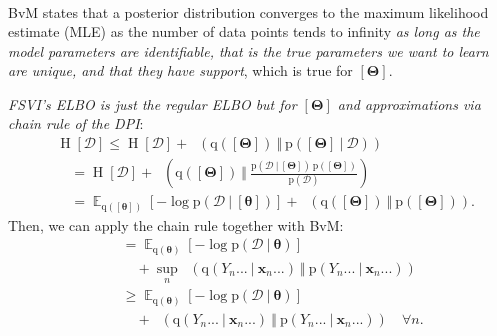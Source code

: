 \documentclass[25pt,a0paper,landscape]{tikzposter}
\DeclareMathOperator{\opExpectation}{\mathbb{E}}
\newcommand{\E}[2]{\opExpectation_{#1} \left [ #2 \right ]}
\newcommand{\MidSymbol}[1][]{\:#1\:}
\newcommand{\given}{\MidSymbol[\vert]}
\DeclareMathOperator{\opEntropy}{H}
\newcommand{\Hof}[1]{\opEntropy[#1]}
\DeclareMathOperator{\opKale}{D_\mathrm{KL}}
\newcommand{\Kale}[2]{\opKale(#1 \MidSymbol[\Vert] #2)}
\newcommand{\opp}{\mathrm{p}}
\newcommand{\pof}[1]{\opp(#1)}
\newcommand{\opq}{\mathrm{q}}
\newcommand{\qof}[1]{\opq(#1)}
\newcommand{\w}{\boldsymbol{\theta}}
\newcommand{\W}{\boldsymbol{\Theta}}
\newcommand{\Dany}{\mathcal{D}}
\newcommand{\Y}{Y}
\newcommand{\x}{\boldsymbol{x}}
\begin{document}
\begin{columns}
{\begin{multicols}{2}
\begin{proofbox}[title=Equality in the Infinite Data Limit]
\begin{multline*}
      \end{multline*}
    \end{proofbox}
    \begin{theorybox}[title=Bernstein von Mises' Theorem]
      BvM states that a posterior distribution converges to the maximum likelihood estimate (MLE) as the number of data points tends to infinity \emph{as long as the model parameters are identifiable, that is the true parameters we want to learn are unique, and that they have support}, which is true for $[\W]$. 
    \end{theorybox}
    \begin{proofbox}[title=Function-Space Variational Inference \& ELBO]
      \emph{FSVI's ELBO is just the regular ELBO but for $[\W]$ and approximations via chain rule of the DPI}:
      \begin{align*}
        &\Hof{\Dany} \le \Hof{\Dany} + \Kale{\qof{[\W]}}{\pof{[\W] \given \Dany}} \\
        &\quad = \Hof{\Dany} + \Kale{\qof{[\W]}}{\frac{\pof{\Dany \given [\W]} \, \pof{[\W]}}{\pof{\Dany}}} \\
        &\quad = 
        \E{\qof{[\w]}}{-\log \pof{\Dany \given [\w]}} + \Kale{\qof{[\W]}}{\pof{[\W]}}.
      \end{align*}
      Then, we can apply the chain rule together with BvM:
      \begin{align*}
        &\quad = \E{\qof{\w}}{-\log \pof{\Dany \given \w}} \\
        &\quad \quad + \sup_n \Kale{\qof{\Y_n... \given \x_n...}}{\pof{\Y_n... \given \x_n...}} \\
        &\quad \ge \E{\qof{\w}}{-\log \pof{\Dany \given \w}} \\
        &\quad \quad + \Kale{\qof{\Y_n... \given \x_n...}}{\pof{\Y_n... \given \x_n...}} \quad \forall n.
      \end{align*}
    \end{proofbox}
    \end{multicols}
}
\end{columns}

\end{document}
